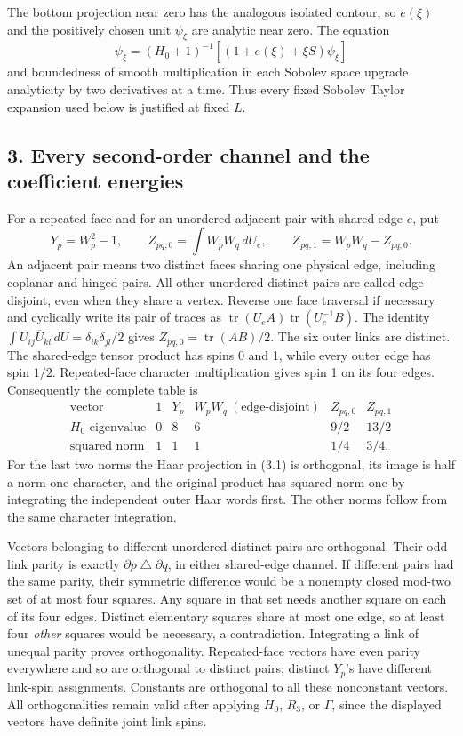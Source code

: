 \documentclass[
  11pt,
]{article}
\begin{document}
The bottom projection near zero has the analogous isolated contour, so
\(e(\xi)\) and the positively chosen unit \(\psi_\xi\) are analytic near
zero. The equation \[
 \psi_\xi=(H_0+1)^{-1}[(1+e(\xi)+\xi S)\psi_\xi]
\tag{2.8}
\] and boundedness of smooth multiplication in each Sobolev space
upgrade analyticity by two derivatives at a time. Thus every fixed
Sobolev Taylor expansion used below is justified at fixed \(L\).

\subsection{3. Every second-order channel and the coefficient
energies}\label{magnetic-part-9-every-second-order-channel-and-the-coefficient-energies}

For a repeated face and for an unordered adjacent pair with shared edge
\(e\), put \[
 Y_p=W_p^2-1,\qquad
 Z_{pq,0}=\int W_pW_q\,dU_e,\qquad Z_{pq,1}=W_pW_q-Z_{pq,0}.
\tag{3.1}
\] An adjacent pair means two distinct faces sharing one physical edge,
including coplanar and hinged pairs. All other unordered distinct pairs
are called edge-disjoint, even when they share a vertex. Reverse one
face traversal if necessary and cyclically write its pair of traces as
\(\operatorname{tr}(U_eA)\operatorname{tr}(U_e^{-1}B)\). The identity
\(\int U_{ij}\overline U_{kl}\,dU
=\delta_{ik}\delta_{jl}/2\) gives \(Z_{pq,0}=\operatorname{tr}(AB)/2\).
The six outer links are distinct. The shared-edge tensor product has
spins 0 and 1, while every outer edge has spin \(1/2\). Repeated-face
character multiplication gives spin 1 on its four edges. Consequently
the complete table is \[
\begin{array}{c|ccccc}
 \text{vector}&1&Y_p&W_pW_q\ (\text{edge-disjoint})&Z_{pq,0}&Z_{pq,1}\\\hline
 H_0\text{ eigenvalue}&0&8&6&9/2&13/2\\
 \text{squared norm}&1&1&1&1/4&3/4.
\end{array}
\tag{3.2}
\] For the last two norms the Haar projection in (3.1) is orthogonal,
its image is half a norm-one character, and the original product has
squared norm one by integrating the independent outer Haar words first.
The other norms follow from the same character integration.

Vectors belonging to different unordered distinct pairs are orthogonal.
Their odd link parity is exactly
\(\partial p\mathbin\triangle\partial q\), in either shared-edge
channel. If different pairs had the same parity, their symmetric
difference would be a nonempty closed mod-two set of at most four
squares. Any square in that set needs another square on each of its four
edges. Distinct elementary squares share at most one edge, so at least
four \emph{other} squares would be necessary, a contradiction.
Integrating a link of unequal parity proves orthogonality. Repeated-face
vectors have even parity everywhere and so are orthogonal to distinct
pairs; distinct \(Y_p\)'s have different link-spin assignments.
Constants are orthogonal to all these nonconstant vectors. All
orthogonalities remain valid after applying \(H_0\), \(R_3\), or
\(\Gamma\), since the displayed vectors have definite joint link spins.
\end{document}
